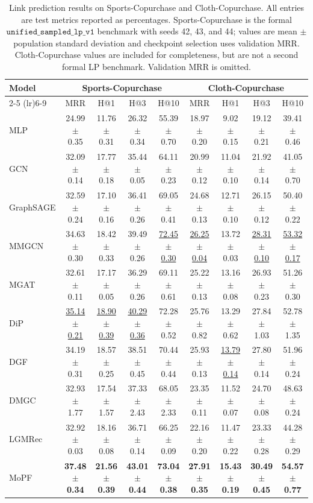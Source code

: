 \begin{table}[t]
\caption{Link prediction results on Sports-Copurchase and Cloth-Copurchase. All entries are test metrics reported as percentages. Sports-Copurchase is the formal $\texttt{unified\_sampled\_lp\_v1}$ benchmark with seeds 42, 43, and 44; values are mean $\pm$ population standard deviation and checkpoint selection uses validation MRR. Cloth-Copurchase values are included for completeness, but are not a second formal LP benchmark. Validation MRR is omitted.}
\label{tab:lp_main}
\centering
\scriptsize
\setlength{\tabcolsep}{3pt}
\renewcommand{\arraystretch}{1.08}
\begin{tabular}{lcccccccc}
\toprule
Model & \multicolumn{4}{c}{Sports-Copurchase} & \multicolumn{4}{c}{Cloth-Copurchase} \\
\cmidrule(lr){2-5} \cmidrule(lr){6-9}
 & MRR & H@1 & H@3 & H@10 & MRR & H@1 & H@3 & H@10 \\
\midrule
MLP & 24.99 $\pm$ 0.35 & 11.76 $\pm$ 0.31 & 26.32 $\pm$ 0.34 & 55.39 $\pm$ 0.70 & 18.97 $\pm$ 0.20 & 9.02 $\pm$ 0.15 & 19.12 $\pm$ 0.21 & 39.41 $\pm$ 0.46 \\
GCN & 32.09 $\pm$ 0.14 & 17.77 $\pm$ 0.18 & 35.44 $\pm$ 0.05 & 64.11 $\pm$ 0.23 & 20.99 $\pm$ 0.12 & 11.04 $\pm$ 0.10 & 21.92 $\pm$ 0.14 & 41.05 $\pm$ 0.70 \\
GraphSAGE & 32.59 $\pm$ 0.24 & 17.10 $\pm$ 0.16 & 36.41 $\pm$ 0.26 & 69.05 $\pm$ 0.41 & 24.68 $\pm$ 0.13 & 12.71 $\pm$ 0.10 & 26.15 $\pm$ 0.12 & 50.40 $\pm$ 0.22 \\
MMGCN & 34.63 $\pm$ 0.30 & 18.42 $\pm$ 0.33 & 39.49 $\pm$ 0.26 & \underline{72.45 $\pm$ 0.30} & \underline{26.25 $\pm$ 0.04} & 13.72 $\pm$ 0.03 & \underline{28.31 $\pm$ 0.10} & \underline{53.32 $\pm$ 0.17} \\
MGAT & 32.61 $\pm$ 0.11 & 17.17 $\pm$ 0.05 & 36.29 $\pm$ 0.26 & 69.11 $\pm$ 0.61 & 25.22 $\pm$ 0.13 & 13.16 $\pm$ 0.08 & 26.93 $\pm$ 0.23 & 51.26 $\pm$ 0.30 \\
DiP & \underline{35.14 $\pm$ 0.21} & \underline{18.90 $\pm$ 0.39} & \underline{40.29 $\pm$ 0.36} & 72.28 $\pm$ 0.52 & 25.76 $\pm$ 0.82 & 13.29 $\pm$ 0.62 & 27.84 $\pm$ 1.03 & 52.78 $\pm$ 1.35 \\
DGF & 34.19 $\pm$ 0.31 & 18.57 $\pm$ 0.25 & 38.51 $\pm$ 0.45 & 70.44 $\pm$ 0.44 & 25.93 $\pm$ 0.13 & \underline{13.79 $\pm$ 0.14} & 27.80 $\pm$ 0.14 & 51.96 $\pm$ 0.24 \\
DMGC & 32.93 $\pm$ 1.77 & 17.54 $\pm$ 1.57 & 37.33 $\pm$ 2.43 & 68.05 $\pm$ 2.33 & 23.35 $\pm$ 0.11 & 11.52 $\pm$ 0.07 & 24.70 $\pm$ 0.08 & 48.63 $\pm$ 0.24 \\
LGMRec & 32.92 $\pm$ 0.03 & 18.16 $\pm$ 0.08 & 36.71 $\pm$ 0.14 & 66.25 $\pm$ 0.09 & 22.16 $\pm$ 0.20 & 11.47 $\pm$ 0.22 & 23.33 $\pm$ 0.28 & 44.28 $\pm$ 0.29 \\
\midrule
MoPF & \textbf{37.48 $\pm$ 0.34} & \textbf{21.56 $\pm$ 0.39} & \textbf{43.01 $\pm$ 0.44} & \textbf{73.04 $\pm$ 0.38} & \textbf{27.91 $\pm$ 0.35} & \textbf{15.43 $\pm$ 0.19} & \textbf{30.49 $\pm$ 0.45} & \textbf{54.57 $\pm$ 0.77} \\
\bottomrule
\end{tabular}
\end{table}
